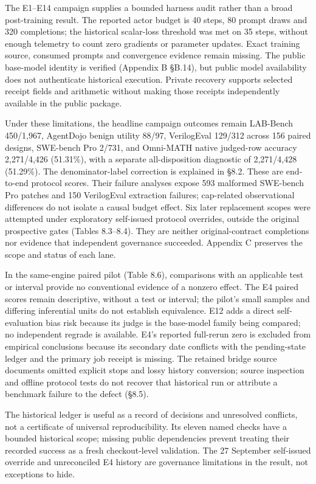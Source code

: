 \documentclass[12pt,a4paper]{report}
\begin{document}
The E1--E14 campaign supplies a bounded harness audit rather than a
broad post-training result. The reported actor budget is 40 steps, 80
prompt draws and 320 completions; the historical scalar-loss threshold
was met on 35 steps, without enough telemetry to count zero gradients or
parameter updates. Exact training source, consumed prompts and
convergence evidence remain missing. The public base-model identity is
verified (Appendix B §B.14), but public model availability does not
authenticate historical execution. Private recovery supports selected
receipt fields and arithmetic without making those receipts
independently available in the public package.

Under these limitations, the headline campaign outcomes remain LAB-Bench
450/1,967, AgentDojo benign utility 88/97, VerilogEval 129/312 across
156 paired designs, SWE-bench Pro 2/731, and Omni-MATH native judged-row
accuracy 2,271/4,426 (51.31\%), with a separate all-disposition
diagnostic of 2,271/4,428 (51.29\%). The denominator-label correction is
explained in §8.2. These are end-to-end protocol scores. Their failure
analyses expose 593 malformed SWE-bench Pro patches and 150 VerilogEval
extraction failures; cap-related observational differences do not
isolate a causal budget effect. Six later replacement scopes were
attempted under exploratory self-issued protocol overrides, outside the
original prospective gates (Tables 8.3--8.4). They are neither
original-contract completions nor evidence that independent governance
succeeded. Appendix C preserves the scope and status of each lane.

In the same-engine paired pilot (Table 8.6), comparisons with an
applicable test or interval provide no conventional evidence of a
nonzero effect. The E4 paired scores remain descriptive, without a test
or interval; the pilot's small samples and differing inferential units
do not establish equivalence. E12 adds a direct self-evaluation bias
risk because its judge is the base-model family being compared; no
independent regrade is available. E4's reported full-rerun zero is
excluded from empirical conclusions because its secondary date conflicts
with the pending-state ledger and the primary job receipt is missing.
The retained bridge source documents omitted explicit stops and lossy
history conversion; source inspection and offline protocol tests do not
recover that historical run or attribute a benchmark failure to the
defect (§8.5).

The historical ledger is useful as a record of decisions and unresolved
conflicts, not a certificate of universal reproducibility. Its eleven
named checks have a bounded historical scope; missing public
dependencies prevent treating their recorded success as a fresh
checkout-level validation. The 27 September self-issued override and
unreconciled E4 history are governance limitations in the result, not
exceptions to hide.
\end{document}
